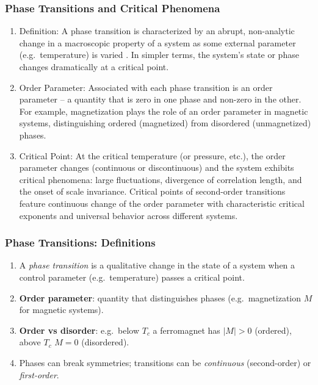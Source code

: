 \documentclass{beamer}
\begin{document}
\begin{frame}
\frametitle{Phase Transitions and Critical Phenomena}

\begin{enumerate}
\item Definition: A phase transition is characterized by an abrupt, non-analytic change in a macroscopic property of a system as some external parameter (e.g.~temperature) is varied . In simpler terms, the system’s state or phase changes dramatically at a critical point.

\item Order Parameter: Associated with each phase transition is an order parameter – a quantity that is zero in one phase and non-zero in the other. For example, magnetization plays the role of an order parameter in magnetic systems, distinguishing ordered (magnetized) from disordered (unmagnetized) phases.

\item Critical Point: At the critical temperature (or pressure, etc.), the order parameter changes (continuous or discontinuous) and the system exhibits critical phenomena: large fluctuations, divergence of correlation length, and the onset of scale invariance. Critical points of second-order transitions feature continuous change of the order parameter with characteristic critical exponents and universal behavior across different systems.
\end{enumerate}

\noindent
\end{frame}

\begin{frame}
\frametitle{Phase Transitions: Definitions}

\begin{enumerate}
\item A \emph{phase transition} is a qualitative change in the state of a system when a control parameter (e.g.\ temperature) passes a critical point.

\item \textbf{Order parameter}: quantity that distinguishes phases (e.g.\ magnetization $M$ for magnetic systems).

\item \textbf{Order vs disorder}: e.g.\ below $T_c$ a ferromagnet has $|M|>0$ (ordered), above $T_c$ $M=0$ (disordered).

\item Phases can break symmetries; transitions can be \emph{continuous} (second-order) or \emph{first-order}.
\end{enumerate}

\noindent
\end{frame}
\end{document}
